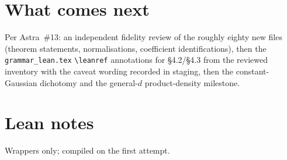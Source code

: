 \documentclass[11pt]{article}
\begin{document}
\section{What comes next}
Per Astra~\#13: an independent fidelity review of the roughly eighty new files (theorem statements,
normalisations, coefficient identifications), then the \texttt{grammar\_lean.tex} \texttt{\textbackslash leanref}
annotations for §4.2/§4.3 from the reviewed inventory with the caveat wording recorded in staging,
then the constant-Gaussian dichotomy and the general-$d$ product-density milestone.

\section{Lean notes}
Wrappers only; compiled on the first attempt.
\end{document}
